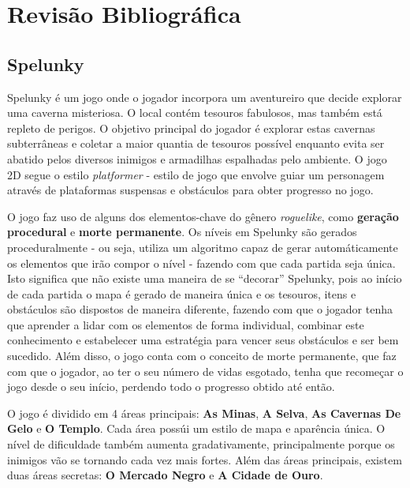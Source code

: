 \chapter{\label{chap:lit-review}Revisão Bibliográfica}

\section{Spelunky}
Spelunky \cite{SPELUNKYWEB} é um jogo onde o jogador incorpora um aventureiro
que decide explorar uma caverna misteriosa. O local contém tesouros fabulosos,
mas também está repleto de perigos. O objetivo principal do jogador é explorar
estas cavernas subterrâneas e coletar a maior quantia de tesouros possível
enquanto evita ser abatido pelos diversos inimigos e armadilhas espalhadas pelo
ambiente. O jogo 2D segue o estilo \textit{platformer} - estilo de jogo
que envolve guiar um personagem através de plataformas suspensas e obstáculos
para obter progresso no jogo.

O jogo faz uso de alguns dos elementos-chave do gênero \textit{roguelike}, como
\textbf{geração procedural} e \textbf{morte permanente}. Os níveis em Spelunky
são gerados proceduralmente - ou seja, utiliza um algoritmo capaz de gerar
automáticamente os elementos que irão compor o nível - fazendo com que cada
partida seja única. Isto significa que não existe uma maneira de se ``decorar''
Spelunky, pois ao início de cada partida o mapa é gerado de maneira única e os
tesouros, itens e obstáculos são dispostos de maneira diferente, fazendo com que
o jogador tenha que aprender a lidar com os elementos de forma individual,
combinar este conhecimento e estabelecer uma estratégia para vencer seus
obstáculos e ser bem sucedido. Além disso, o jogo conta com o conceito de morte
permanente, que faz com que o jogador, ao ter o seu número de vidas esgotado,
tenha que recomeçar o jogo desde o seu início, perdendo todo o progresso obtido
até então.

O jogo é dividido em 4 áreas principais: \textbf{As Minas}, \textbf{A Selva},
\textbf{As Cavernas De Gelo} e \textbf{O Templo}. Cada área possúi um estilo de
mapa e aparência única. O nível de dificuldade também aumenta gradativamente,
principalmente porque os inimigos vão se tornando cada vez mais fortes. Além das
áreas principais, existem duas áreas secretas: \textbf{O Mercado Negro} e
\textbf{A Cidade de Ouro}.

